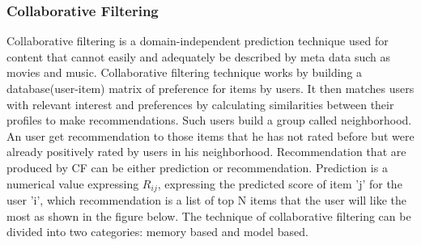 \subsubsection{Collaborative Filtering}
Collaborative filtering \cite{rmain}is a domain-independent prediction technique used for content that cannot easily and adequately be described by meta data such as movies and music. Collaborative filtering technique works by building a database(user-item) matrix of preference for items by users. It then matches users with relevant interest and preferences by calculating similarities between their profiles to make recommendations. Such users build a group called neighborhood. An user get recommendation to those items that he has not rated before but were already positively rated by users in his neighborhood. Recommendation that are produced by CF can be either prediction or recommendation. Prediction is a numerical value expressing $R_{ij}$, expressing the predicted score of item 'j' for the user 'i', which recommendation is a list of top N items that the user will like the most as shown in the figure below. The technique of collaborative filtering can be divided into two categories: memory based and model based. 
